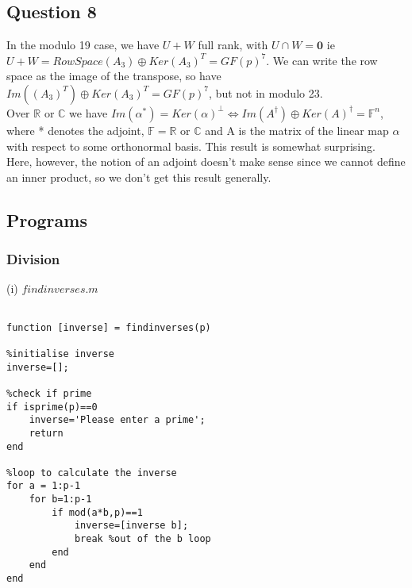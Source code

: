 \documentclass[10pt,a4paper]{report}
\begin{document}
\subsection*{Question 8}
In the modulo 19 case, we have $U+W$ full rank, with $U \cap W = \bm{0}$ ie $U+W=RowSpace(A_3) \oplus Ker(A_3)^T =GF(p)^7$. We can write the row space as the image of the transpose, so have $Im((A_3)^T) \oplus Ker(A_3)^T =GF(p)^7$, but not in modulo 23.\\

Over $\mathbb{R}$ or $\mathbb{C}$ we have $Im(\alpha^*)=	Ker(\alpha)^\perp \Leftrightarrow Im(A^\dagger) \oplus Ker(A)^\dagger = \mathbb{F}^n$, where * denotes the adjoint, $\mathbb{F}=\mathbb{R}$ or $\mathbb{C}$  and A is the matrix of the linear map $\alpha$ with respect to some orthonormal basis. This result is somewhat surprising.\\

Here, however, the notion of an adjoint doesn't make sense since we cannot define an inner product, so we don't get this result generally.



\newpage

\subsection*{Programs}

\vspace{1cm}

\subsubsection{Division}

\vspace{0.5cm}

(i) $findinverses.m$
\begin{verbatim}

function [inverse] = findinverses(p)

%initialise inverse
inverse=[];

%check if prime
if isprime(p)==0
    inverse='Please enter a prime';
    return
end

%loop to calculate the inverse
for a = 1:p-1
    for b=1:p-1
        if mod(a*b,p)==1
            inverse=[inverse b];
            break %out of the b loop
        end
    end
end

\end{verbatim}
 
\vspace{1cm}
\end{document}
